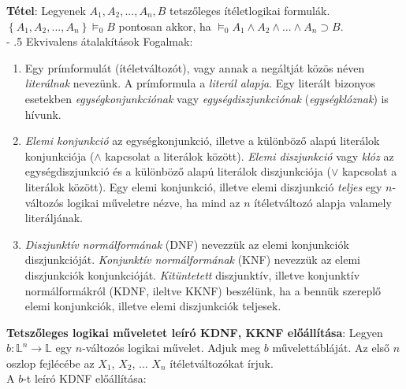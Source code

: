 \documentclass[margin=0px]{article}
\makeatletter
\renewcommand\paragraph{%
	\@startsection{paragraph}{4}{0mm}%
	{-\baselineskip}%
	{.5\baselineskip}%
	{\normalfont\normalsize\bfseries}}
\makeatother
\begin{document}
\noindent \textbf{Tétel}: Legyenek $A_{1},A_{2},...,A_{n}, B$ tetszőleges ítéletlogikai formulák.
$\left\{A_{1},A_{2},...,A_{n}\right\} \models_{0} B$ pontosan akkor, ha
$\models_{0} A_{1} \wedge A_{2} \wedge ... \wedge A_{n} \supset B$.\\

\paragraph{Ekvivalens átalakítások}
Fogalmak:
\begin{enumerate}
    \item	Egy prímformulát (ítéletváltozót), vagy annak a negáltját közös néven \textit{literálnak} nevezünk. A prímformula
          a \textit{literál alapja}. Egy literált bizonyos esetekben \textit{egységkonjunkciónak} vagy \textit{egységdiszjunkciónak}
          (\textit{egységklóznak}) is hívunk.

    \item	\textit{Elemi konjunkció} az egységkonjunkció, illetve a különböző alapú literálok konjunkciója ($\wedge$ kapcsolat
          a literálok között). \textit{Elemi diszjunkció} vagy \textit{klóz} az egységdiszjunkció és a különböző alapú literálok
          diszjunkciója ($\vee$ kapcsolat a literálok között). Egy elemi konjunkció, illetve elemi diszjunkció \textit{teljes}
          egy $n$-változós logikai műveletre nézve, ha mind az $n$ ítéletváltozó alapja valamely literáljának.

    \item	\textit{Diszjunktív normálformának} (DNF) nevezzük az elemi konjunkciók diszjunkcióját.
          \textit{Konjunktív normálformának} (KNF) nevezzük az elemi diszjunkciók konjunkcióját. \textit{Kitüntetett}
          diszjunktív, illetve konjunktív normálformákról (KDNF, ileltve KKNF) beszélünk, ha a bennük szereplő
          elemi konjunkciók, illetve elemi diszjunkciók teljesek.

\end{enumerate}

\noindent \textbf{Tetszőleges logikai műveletet leíró KDNF, KKNF előállítása}:	Legyen $b: \mathbb{L}^{n} \to \mathbb{L}$
egy $n$-változós logikai művelet. Adjuk meg $b$ művelettábláját.
Az első $n$ oszlop fejlécébe az $X_{1}$, $X_{2}$, ... $X_{n}$ ítéletváltozókat írjuk.\\

\noindent A $b$-t leíró KDNF előállítása:
\end{document}
